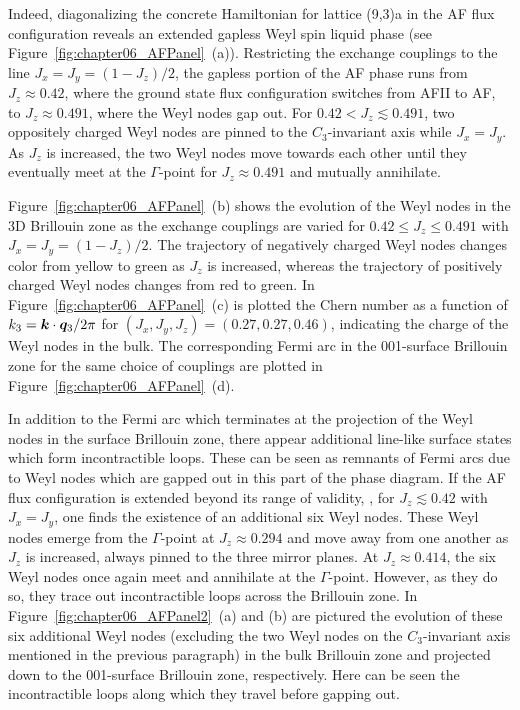 Indeed, diagonalizing the concrete Hamiltonian for lattice (9,3)a in the AF flux configuration reveals an extended gapless Weyl spin liquid phase (see Figure~\ref{fig:chapter06_AFPanel}~(a)).
Restricting the exchange couplings to the line $J_x = J_y = (1 - J_z)/2$, the gapless portion of the AF phase runs from $J_z \approx 0.42$, where the ground state flux configuration switches from AFII to AF, to $J_z \approx 0.491$, where the Weyl nodes gap out.
For $0.42 < J_z \lesssim 0.491$, two oppositely charged Weyl nodes are pinned to the $C_3$-invariant axis while $J_x = J_y$.
As $J_z$ is increased, the two Weyl nodes move towards each other until they eventually meet at the $\Gamma$-point for $J_z \approx 0.491$ and mutually annihilate.

Figure~\ref{fig:chapter06_AFPanel}~(b) shows the evolution of the Weyl nodes in the 3D Brillouin zone as the exchange couplings are varied for $0.42 \leq J_z \leq 0.491$ with $J_x = J_y = (1 - J_z)/2$.
The trajectory of negatively charged Weyl nodes changes color from yellow to green as $J_z$ is increased, whereas the trajectory of positively charged Weyl nodes changes from red to green.
In Figure~\ref{fig:chapter06_AFPanel}~(c) is plotted the Chern number as a function of $k_3 = \bm{k} \cdot \bm{q}_3 / 2\pi$ for $(J_x, J_y, J_z) = (0.27, 0.27, 0.46)$, indicating the charge of the Weyl nodes in the bulk.
The corresponding Fermi arc in the 001-surface Brillouin zone for the same choice of couplings are plotted in Figure~\ref{fig:chapter06_AFPanel}~(d).

In addition to the Fermi arc which terminates at the projection of the Weyl nodes in the surface Brillouin zone, there appear additional line-like surface states which form incontractible loops.
These can be seen as remnants of Fermi arcs due to Weyl nodes which are gapped out in this part of the phase diagram.
If the AF flux configuration is extended beyond its range of validity, \ie, for $J_z \lesssim 0.42$ with $J_x = J_y$, one finds the existence of an additional six Weyl nodes.
These Weyl nodes emerge from the $\Gamma$-point at $J_z \approx 0.294$ and move away from one another as $J_z$ is increased, always pinned to the three mirror planes.
At $J_z \approx 0.414$, the six Weyl nodes once again meet and annihilate at the $\Gamma$-point.
However, as they do so, they trace out incontractible loops across the Brillouin zone.
In Figure~\ref{fig:chapter06_AFPanel2}~(a) and (b) are pictured the evolution of these six additional Weyl nodes (excluding the two Weyl nodes on the $C_3$-invariant axis mentioned in the previous paragraph) in the bulk Brillouin zone and projected down to the 001-surface Brillouin zone, respectively.
Here can be seen the incontractible loops along which they travel before gapping out.

